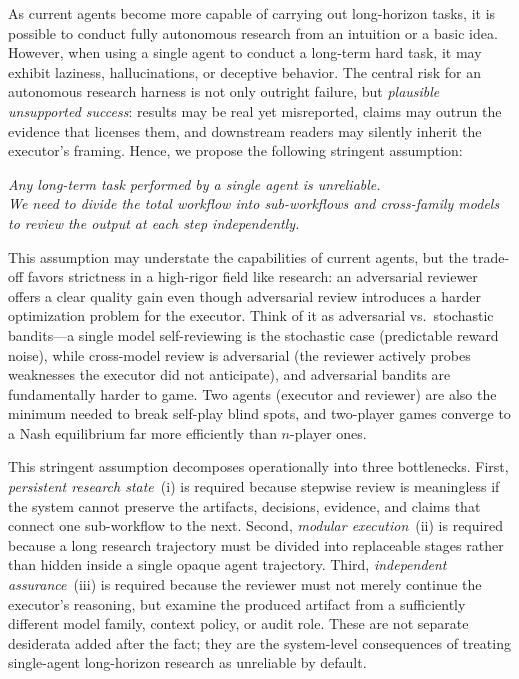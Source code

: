 \documentclass{article}
\theoremstyle{remark}
\begin{document}
As current agents become more capable of carrying out long-horizon tasks, it is possible to conduct fully autonomous research from an intuition or a basic idea. However, when using a single agent to conduct a long-term hard task, it may exhibit laziness, hallucinations, or deceptive behavior.
The central risk for an autonomous research harness is not only outright failure, but \emph{plausible unsupported success}: results may be real yet misreported, claims may outrun the evidence that licenses them, and downstream readers may silently inherit the executor's framing. Hence, we propose the following stringent assumption:
\begin{center}
    \textit{Any long-term task performed by a single agent is unreliable.}\\
        \textit{We need to divide the total workflow into sub-workflows and cross-family models to review the output at each step independently.}
\end{center}
This assumption may understate the capabilities of current agents, but the trade-off favors strictness in a high-rigor field like research: an adversarial reviewer offers a clear quality gain even though adversarial review introduces a harder optimization problem for the executor. Think of it as adversarial vs.\ stochastic bandits---a single model self-reviewing is the stochastic case (predictable reward noise), while cross-model review is adversarial (the reviewer actively probes weaknesses the executor did not anticipate), and adversarial bandits are fundamentally harder to game. Two agents (executor and reviewer) are also the minimum needed to break self-play blind spots, and two-player games converge to a Nash equilibrium far more efficiently than $n$-player ones.

This stringent assumption decomposes operationally into three bottlenecks.
First, \emph{persistent research state}~(i) is required because stepwise review is meaningless if the system cannot preserve the artifacts, decisions, evidence, and claims that connect one sub-workflow to the next.
Second, \emph{modular execution}~(ii) is required because a long research trajectory must be divided into replaceable stages rather than hidden inside a single opaque agent trajectory.
Third, \emph{independent assurance}~(iii) is required because the reviewer must not merely continue the executor's reasoning, but examine the produced artifact from a sufficiently different model family, context policy, or audit role.
These are not separate desiderata added after the fact; they are the system-level consequences of treating single-agent long-horizon research as unreliable by default.
\end{document}
